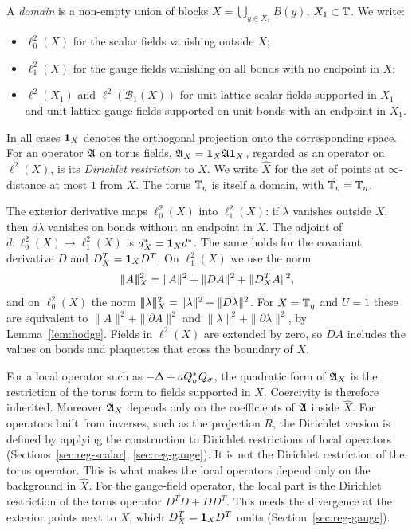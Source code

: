 \begin{definition}[Domains]\label{def:domain}
A \emph{domain} is a non-empty union of blocks $X=\bigcup_{y\in X_1}B(y)$, $X_1\subset\mathbb T$. We write:
\begin{itemize}
\item $\ell^2_0(X)$ for the scalar fields vanishing outside $X$;
\item $\ell^2_1(X)$ for the gauge fields vanishing on all bonds with no endpoint in $X$;
\item $\ell^2(X_1)$ and $\ell^2(\mathcal B_1(X))$ for unit-lattice scalar fields supported in $X_1$ and unit-lattice gauge fields supported on unit bonds with an endpoint in $X_1$.
\end{itemize}
In all cases $\mathbf 1_X$ denotes the orthogonal projection onto the corresponding space. For an operator $\mathfrak A$ on torus fields, $\mathfrak A_X=\mathbf 1_X\mathfrak A\mathbf 1_X$, regarded as an operator on $\ell^2(X)$, is its \emph{Dirichlet restriction} to $X$. We write $\hat X$ for the set of points at $\infty$-distance at most $1$ from $X$. The torus $\mathbb T_\eta$ is itself a domain, with $\hat{\mathbb T_\eta}=\mathbb T_\eta$.
\end{definition}

The exterior derivative maps $\ell^2_0(X)$ into $\ell^2_1(X)$: if $\lambda$ vanishes outside $X$, then $d\lambda$ vanishes on bonds without an endpoint in $X$. The adjoint of $d:\ell^2_0(X)\to\ell^2_1(X)$ is $d^*_X=\mathbf 1_Xd^*$. The same holds for the covariant derivative $D$ and $D^T_X=\mathbf 1_XD^T$. On $\ell^2_1(X)$ we use the norm
\[
|\!|\!|A|\!|\!|_X^2=\|A\|^2+\|DA\|^2+\|D^T_XA\|^2 ,
\]
and on $\ell^2_0(X)$ the norm $|\!|\!|\lambda|\!|\!|_X^2=\|\lambda\|^2+\|D\lambda\|^2$. For $X=\mathbb T_\eta$ and $U=1$ these are equivalent to $\|A\|^2+\|\partial A\|^2$ and $\|\lambda\|^2+\|\partial\lambda\|^2$, by Lemma~\ref{lem:hodge}. Fields in $\ell^2(X)$ are extended by zero, so $DA$ includes the values on bonds and plaquettes that cross the boundary of $X$.

\begin{remark}
For a local operator such as $-\Delta+aQ_\sigma^*Q_\sigma$, the quadratic form of $\mathfrak A_X$ is the restriction of the torus form to fields supported in $X$. Coercivity is therefore inherited. Moreover $\mathfrak A_X$ depends only on the coefficients of $\mathfrak A$ inside $\hat X$. For operators built from inverses, such as the projection $R$, the Dirichlet version is defined by applying the construction to Dirichlet restrictions of local operators (Sections~\ref{sec:reg-scalar}, \ref{sec:reg-gauge}). It is not the Dirichlet restriction of the torus operator. This is what makes the local operators depend only on the background in $\hat X$. For the gauge-field operator, the local part is the Dirichlet restriction of the torus operator $D^TD+DD^T$. This needs the divergence at the exterior points next to $X$, which $D^T_X=\mathbf 1_XD^T$ omits (Section~\ref{sec:reg-gauge}).
\end{remark}

